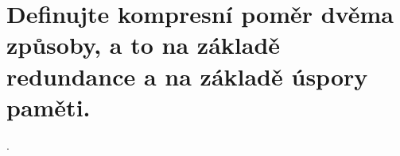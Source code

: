 \section{Definujte kompresní poměr dvěma způsoby, a to na základě redundance a na základě úspory paměti.}.